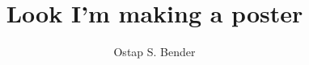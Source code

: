 \documentclass[xcolor={svgnames}]{beamer}
\begin{document}
\title{Look I'm making a poster}
\author{Ostap S. Bender}
\end{document}
